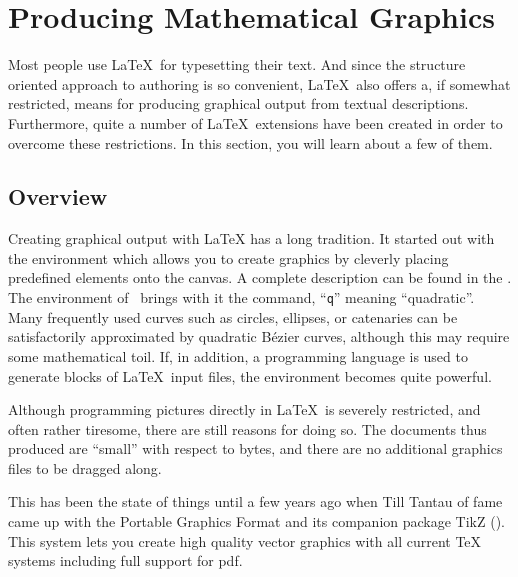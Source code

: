 \newcommand{\graphicscompanion}{\emph{The \LaTeX{} Graphics Companion}~\cite{graphicscompanion}}
\newcommand{\hobby}{\citetitle{metapost}~\cite{metapost}}
\newcommand{\hoenig}{\emph{\TeX{} Unbound}~\cite{unbound}}
\newcommand{\graphicsinlatex}{\emph{Graphics in \LaTeXe{}}~\cite{ursoswald}}

\chapter{Producing Mathematical Graphics}\label{chap:graphics}

\begin{intro}
  Most people use \LaTeX\ for typesetting their text. And since the structure oriented approach to authoring is so convenient, \LaTeX\ also offers a,
  if somewhat restricted, means for producing graphical output from textual
  descriptions. Furthermore, quite a number of \LaTeX\ extensions have been created
  in order to overcome these restrictions. In this section, you will learn about a
  few of them.
\end{intro}

\section{Overview}

Creating graphical output with \LaTeX{} has a long tradition. It started out
with the  environment which allows you to create graphics by
cleverly placing predefined elements onto the canvas. A complete
description can be found in the \manual. The  environment of
\LaTeXe\ brings with it the  command, ``\texttt{q}'' meaning
``quadratic''.  Many frequently used curves such as circles, ellipses, or
catenaries can be satisfactorily approximated by quadratic B\'ezier curves,
although this may require some mathematical toil. If, in addition, a
programming language is used to generate  blocks of \LaTeX\
input files, the  environment becomes quite powerful.

Although programming pictures directly in \LaTeX\ is severely restricted,
and often rather tiresome, there are still reasons for doing so. The documents
thus produced are ``small'' with respect to bytes, and there are no additional
graphics files to be dragged along.

This has been the state of things until a few years ago when Till Tantau of
\pai{beamer} fame came up with the Portable Graphics Format \pai{pgf} and its
companion package TikZ (\pai{tikz}). This system lets you create high
quality vector graphics with all current \TeX{} systems including full
support for pdf.

